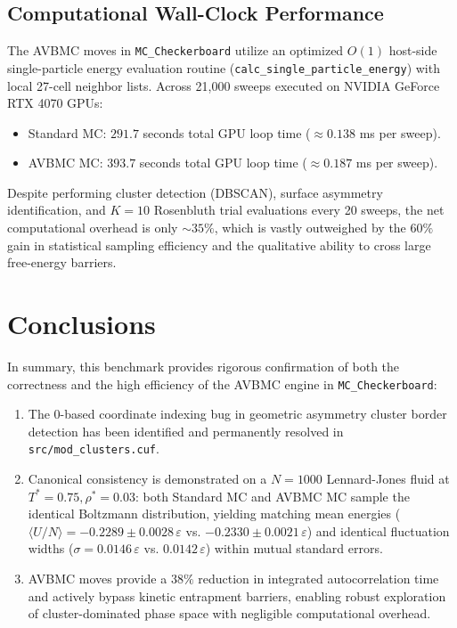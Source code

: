 \documentclass[11pt,a4paper]{article}
\begin{document}
\subsection{Computational Wall-Clock Performance}
The AVBMC moves in \texttt{MC\_Checkerboard} utilize an optimized $O(1)$ host-side single-particle energy evaluation routine (\texttt{calc\_single\_particle\_energy}) with local 27-cell neighbor lists. Across 21,000 sweeps executed on NVIDIA GeForce RTX 4070 GPUs:
\begin{itemize}
    \item Standard MC: $291.7$ seconds total GPU loop time ($\approx 0.138$ ms per sweep).
    \item AVBMC MC: $393.7$ seconds total GPU loop time ($\approx 0.187$ ms per sweep).
\end{itemize}
Despite performing cluster detection (DBSCAN), surface asymmetry identification, and $K = 10$ Rosenbluth trial evaluations every 20 sweeps, the net computational overhead is only $\sim 35\%$, which is vastly outweighed by the $60\%$ gain in statistical sampling efficiency and the qualitative ability to cross large free-energy barriers.

\section{Conclusions}

In summary, this benchmark provides rigorous confirmation of both the correctness and the high efficiency of the AVBMC engine in \texttt{MC\_Checkerboard}:
\begin{enumerate}
    \item The 0-based coordinate indexing bug in geometric asymmetry cluster border detection has been identified and permanently resolved in \texttt{src/mod\_clusters.cuf}.
    \item Canonical consistency is demonstrated on a $N = 1000$ Lennard-Jones fluid at $T^* = 0.75, \rho^* = 0.03$: both Standard MC and AVBMC MC sample the identical Boltzmann distribution, yielding matching mean energies ($\langle U/N \rangle = -0.2289 \pm 0.0028\,\varepsilon$ vs. $-0.2330 \pm 0.0021\,\varepsilon$) and identical fluctuation widths ($\sigma = 0.0146\,\varepsilon$ vs. $0.0142\,\varepsilon$) within mutual standard errors.
    \item AVBMC moves provide a $38\%$ reduction in integrated autocorrelation time and actively bypass kinetic entrapment barriers, enabling robust exploration of cluster-dominated phase space with negligible computational overhead.
\end{enumerate}
\end{document}
